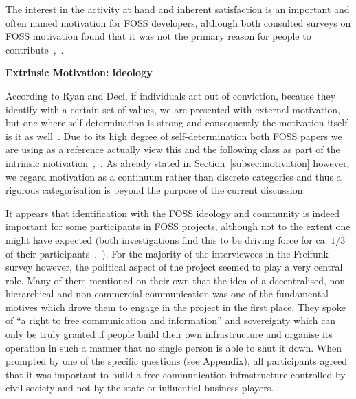 The interest in the activity at hand and inherent satisfaction is an important and often named motivation for FOSS developers, although both consulted surveys on FOSS motivation found that it was not the primary reason for people to contribute~\cite{HarOu2002},~\cite{LakWo2005}.

\textbf{Extrinsic Motivation: ideology}

According to Ryan and Deci, if individuals act out of conviction, because they identify with a certain set of values, we are presented with external motivation, but one where self-determination is strong and consequently the motivation itself is it as well~\cite{RyDe2000}.
Due to its high degree of self-determination both FOSS papers we are using as a reference actually view this and the following class as part of the intrinsic motivation~\cite{LakWo2005},~\cite{HarOu2002}.
As already stated in Section~\ref{subsec:motivation} however, we regard motivation as a continuum rather than discrete categories and thus a rigorous categorisation is beyond the purpose of the current discussion.

It appears that identification with the FOSS ideology and community is indeed important for some participants in FOSS projects, although not to the extent one might have expected (both investigations find this to be driving force for ca. $1/3$ of their participants~\cite{HarOu2002},~\cite{LakWo2005}).
For the majority of the interviewees in the Freifunk survey however, the political aspect of the project seemed to play a very central role.
Many of them mentioned on their own that the idea of a decentralised, non-hierarchical and non-commercial communication was one of the fundamental motives which drove them to engage in the project in the first place.
They spoke of ``a right to free communication and information'' and sovereignty which can only be truly granted if people build their own infrastructure and organise its operation in such a manner that no single person is able to shut it down.
When prompted by one of the specific questions (see Appendix), all participants agreed that it was important to build a free communication infrastructure controlled by civil society and not by the state or influential business players.

